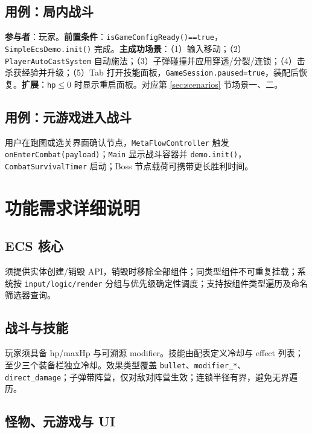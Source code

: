 \documentclass[UTF8,a4paper]{ctexart}
\begin{document}
\subsection{用例：局内战斗}

\textbf{参与者}：玩家。\textbf{前置条件}：\texttt{isGameConfigReady()==true}，\texttt{SimpleEcsDemo.init()} 完成。\textbf{主成功场景}：（1）输入移动；（2）\texttt{PlayerAutoCastSystem} 自动施法；（3）子弹碰撞并应用穿透/分裂/连锁；（4）击杀获经验并升级；（5）Tab 打开技能面板，\texttt{GameSession.paused=true}，装配后恢复。\textbf{扩展}：\texttt{hp}$\leq$0 时显示重启面板。对应第 \ref{sec:scenarios} 节场景一、二。

\subsection{用例：元游戏进入战斗}

用户在跑图或选关界面确认节点，\texttt{MetaFlowController} 触发 \texttt{onEnterCombat(payload)}；\texttt{Main} 显示战斗容器并 \texttt{demo.init()}，\texttt{CombatSurvivalTimer} 启动；Boss 节点载荷可携带更长胜利时间。

\section{功能需求详细说明}
\label{sec:func-detail}

\subsection{ECS 核心}

须提供实体创建/销毁 API，销毁时移除全部组件；同类型组件不可重复挂载；系统按 \texttt{input/logic/render} 分组与优先级确定性调度；支持按组件类型遍历及命名筛选器查询\cite{gregory2018game}。

\subsection{战斗与技能}

玩家须具备 hp/maxHp 与可溯源 modifier。技能由配表定义冷却与 effect 列表；至少三个装备栏独立冷却。效果类型覆盖 \texttt{bullet}、\texttt{modifier\_*}、\texttt{direct\_damage}；子弹带阵营，仅对敌对阵营生效；连锁半径有界，避免无界遍历\cite{helbing2000panic}。

\subsection{怪物、元游戏与 UI}
\end{document}
